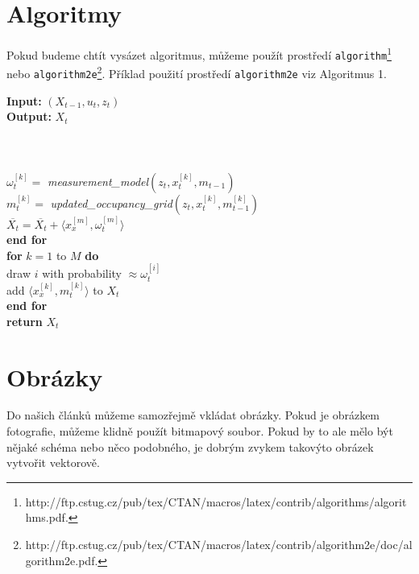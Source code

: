 \documentclass[a4paper,11pt]{article}
\begin{document}
\clearpage


\section{Algoritmy}
Pokud budeme chtít vysázet algoritmus, můžeme použít prostředí \verb|algorithm|\footnote{http://ftp.cstug.cz/pub/tex/CTAN/macros/latex/contrib/algorithms/algorithms.pdf.} nebo \texttt{algorithm2e}\footnote{http://ftp.cstug.cz/pub/tex/CTAN/macros/latex/contrib/algorithm2e/doc/algorithm2e.pdf.}. Příklad použití prostředí \verb|algorithm2e| viz Algoritmus 1.

\begin{algorithm}
    \caption{{\textsc{FastSLAM}}}
    \textbf{Input:} $(X_{t-1}, u_t,z_t)$ \\
    \textbf{Output:} $X_t$ \\
    \SetAlgoLined
    \SetNlSty{}{}{:}
    \qquad{} \\
    \qquad{} \\
    \qquad{} \\
    \qquad{}\qquad$\omega_{t}^{[k]} =$ \textit{measurement\_model}$(z_t, x_t^{[k]}, m_{t-1})$ \\
    \qquad{}\qquad $m_t^{[k]} =$ \textit{updated\_occupancy\_grid}$(z_t, x_t^{[k]}, m_{t-1}^{[k]})$ \\
    \qquad{}\qquad $\overline{X_t} = \overline{X_t} + \langle x_x^{[m]}, \omega_t^{[m]} \rangle$ \\
    \qquad{} \textbf{end for} \\
    \qquad{} \textbf{for} $k = 1$ to $M$ \textbf{do} \\
    \qquad{}\qquad draw $i$ with probability $\approx \omega_t^{[i]}$ \\
    \qquad{}\qquad add $\langle x_x^{[k]}, m_t^{[k]} \rangle$ to $X_t$ \\
    \qquad{} \textbf{end for} \\
    \qquad{} \textbf{return} $X_t$
\end{algorithm}

\section{Obrázky}
Do našich článků můžeme samozřejmě vkládat obrázky. Pokud je obrázkem fotografie, můžeme klidně použít bitmapový soubor. Pokud by to ale mělo být nějaké schéma nebo něco podobného, je dobrým zvykem takovýto obrázek vytvořit vektorově.
\end{document}
